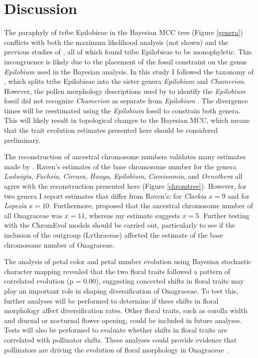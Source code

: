\documentclass[review]{elsarticle}
\begin{document}

\section{Discussion}

The paraphyly of tribe Epilobieae in the Bayesian MCC tree (Figure \ref{genera})
conflicts with both the 
maximum likelihood analysis (not shown) and the previous studies of \citet{Levin2003, Levin2004},
all of which found tribe Epilobieae to be monophyletic.
This incongruence is likely due to the placement of the
fossil constraint on the genus \textit{Epilobium} used in the Bayesian analysis. 
In this study I followed the taxonomy of \citet{wagner2007revised}, 
which splits tribe Epilobieae into the sister genera \textit{Epilobium}
and \textit{Chamerion}.
However, the pollen morphology descriptions used by \citet{grimsson} to identify the
\textit{Epilobium} fossil did not recognize \textit{Chamerion} as separate from
\textit{Epilobium} \citep{Punt2003, Patel1984}. 
The divergence times will be reestimated using the \textit{Epilobium} fossil 
to constrain both genera. 
This will likely result in topological changes to the Bayesian MCC, 
which means that the 
trait evolution estimates presented here should be considered preliminary.

The reconstruction of ancestral chromosome numbers 
validates many estimates made by \citet{Raven1979}.
Raven's estimates of the base chromosome number for the genera
\textit{Ludwigia}, \textit{Fuchsia}, \textit{Circaea}, \textit{Hauya}, 
\textit{Epilobium}, \textit{Camissonia}, and \textit{Oenothera}
all agree with the reconstruction presented here (Figure \ref{chromtree}).
However, for two genera I report estimates that differ from Raven's: 
for \textit{Clarkia} $x=9$ and for \textit{Lopezia} $x=10$.
Furthermore, \citet{Raven1979} proposed that the ancestral
chromosome number of all Onagraceae was $x=11$, whereas
my estimate suggests $x=5$. Further testing with the ChromEvol
models should be carried out, particularly to see if the inclusion
of the outgroup (Lythraceae) affected the estimate of the
base chromosome number of Onagraceae.

The analysis of petal color and petal number evolution using
Bayesian stochastic character mapping
revealed that the two floral traits followed a pattern 
of correlated evolution (p = 0.00), 
suggesting concerted shifts in floral traits 
may play an important role in shaping diversification of Onagraceae. 
To test this, further analyses will be performed to 
determine if these shifts in floral morphology affect diversification rates.
Other floral traits, such as corolla width and diurnal or nocturnal flower opening, 
could be included in future analyses.
Tests will also be performed to evaluate whether 
shifts in floral traits are correlated with pollinator shifts.
These analyses could provide evidence that pollinators are driving the
evolution of floral morphology in Onagraceae \citep{DeWittSmith2010}.
\end{document}
